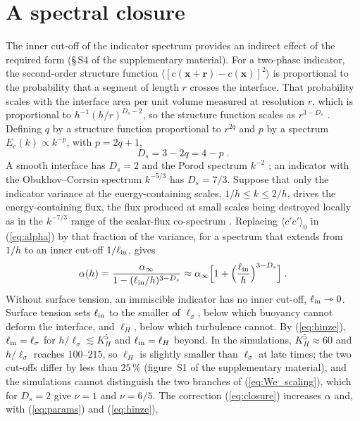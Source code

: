 \documentclass[lineno]{jfm}
\newcommand{\avg}[1]{\langle #1\rangle}
\newcommand{\lls}{\ell_\sigma}
\begin{document}
\section{A spectral closure}\label{sec:closure}

The inner cut-off of the indicator spectrum provides an indirect effect of the required form (\S\,S4 of the supplementary material). For a two-phase indicator, the second-order structure function $\avg{[c(\mathbf x + \mathbf r) - c(\mathbf x)]^2}$ is proportional to the probability that a segment of length $r$ crosses the interface. That probability scales with the interface area per unit volume measured at resolution $r$, which is proportional to $h^{-1}(h/r)^{D_s - 2}$, so the structure function scales as $r^{3 - D_s}$ \citep{Sreenivasan1991}. Defining $q$ by a structure function proportional to $r^{2 q}$ and $p$ by a spectrum $E_c(k) \propto k^{-p}$, with $p = 2 q + 1$,
\begin{equation}
  D_s = 3 - 2 q = 4 - p \;.
  \label{eq:pq}
\end{equation}
A smooth interface has $D_s = 2$ and the Porod spectrum $k^{-2}$ \citep{Porod1951}; an indicator with the Obukhov--Corrsin spectrum $k^{-5/3}$ \citep{Obukhov1949,Corrsin1951} has $D_s = 7/3$. Suppose that only the indicator variance at the energy-containing scales, $1/h \le k \le 2/h$, drives the energy-containing flux, the flux produced at small scales being destroyed locally as in the $k^{-7/3}$ range of the scalar-flux co-spectrum \citep{Lumley1967}. Replacing $\avg{c' c'}_0$ in (\ref{eq:alpha}) by that fraction of the variance, for a spectrum that extends from $1/h$ to an inner cut-off $1/\ell_{\rm in}$, gives
\begin{equation}
  \alpha(h) = \frac{\alpha_\infty}{1 - (\ell_{\rm in}/h)^{3 - D_s}} \approx \alpha_\infty \Big[1 + \Big(\frac{\ell_{\rm in}}{h}\Big)^{3 - D_s}\Big] \;.
  \label{eq:closure}
\end{equation}
Without surface tension, an immiscible indicator has no inner cut-off, $\ell_{\rm in} \rightarrowtriangle 0$. Surface tension sets $\ell_{\rm in}$ to the smaller of $\lls$, below which buoyancy cannot deform the interface, and $\ell_H$, below which turbulence cannot. By (\ref{eq:hinze}), $\ell_{\rm in} = \lls$ for $h/\lls \lesssim K_H^5$ and $\ell_{\rm in} = \ell_H$ beyond. In the simulations, $K_H^5 \approx 60$ and $h/\lls$ reaches $100$--$215$, so $\ell_H$ is slightly smaller than $\lls$ at late times; the two cut-offs differ by less than $25\,\%$ (figure~S1 of the supplementary material), and the simulations cannot distinguish the two branches of (\ref{eq:We_scaling}), which for $D_s = 2$ give $\nu = 1$ and $\nu = 6/5$. The correction (\ref{eq:closure}) increases $\alpha$ and, with (\ref{eq:params}) and (\ref{eq:hinze}),
\end{document}
